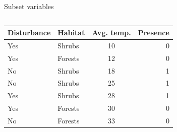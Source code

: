 \documentclass{irdbeamer}
\begin{document}
\begin{frame}{Subset variables}
\begin{columns}
    \begin{column}{0.5\textwidth}
\centering
{\footnotesize
\begin{tabular}{llc|r}
    \toprule
    Disturbance & Habitat & Avg. temp. & Presence \\
    \midrule
    Yes & Shrubs    & 10 & 0 \\
    Yes & Forests   & 12 & 0 \\
    No  & Shrubs    & 18 & 1 \\
    No  & Shrubs    & 25 & 1 \\
    Yes & Shrubs    & 28 & 1 \\
    Yes & Forests   & 30 & 0 \\
    No  & Forests   & 33 & 0 \\
    \bottomrule
\end{tabular}
        }
    \end{column}
    \begin{column}{0.5\textwidth}
\centering
    \end{column}
\end{columns}
\end{frame}
\end{document}
